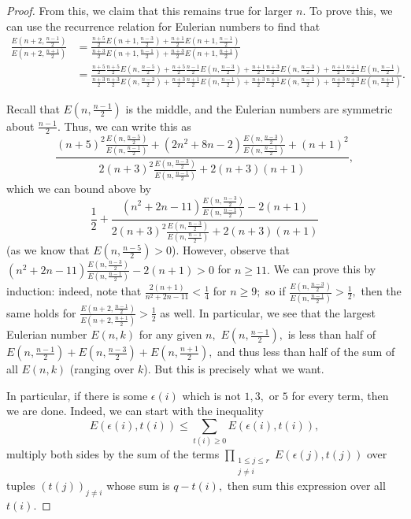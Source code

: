 \documentclass{article}
\theoremstyle{definition}
\theoremstyle{remark}
\begin{document}
\begin{proof}
\par From this, we claim that this remains true for larger $n.$ To prove this, we can use the recurrence relation for Eulerian numbers to find that \begin{align*}\frac{E(n+2, \frac{n-1}{2})}{E(n+2, \frac{n+1}{2})}  & = \frac{\frac{n+5}{2} E(n+1, \frac{n-3}{2}) + \frac{n+1}{2}E(n+1, \frac{n-1}{2})}{\frac{n+3}{2} E(n+1, \frac{n-1}{2}) + \frac{n+3}{2}E(n+1, \frac{n+1}{2})} \\ & = \frac{\frac{n+5}{2} \frac{n+5}{2} E(n, \frac{n-5}{2}) + \frac{n+5}{2} \frac{n-1}{2} E(n, \frac{n-3}{2}) + \frac{n+1}{2} \frac{n+3}{2} E(n, \frac{n-3}{2}) + \frac{n+1}{2} \frac{n + 1}{2}E(n, \frac{n-1}{2})}{\frac{n+3}{2} \frac{n+3}{2} E(n, \frac{n-3}{2}) + \frac{n+3}{2} \frac{n+1}{2} E(n, \frac{n-1}{2}) + \frac{n+3}{2} \frac{n+1}{2} E(n, \frac{n-1}{2}) + \frac{n+3}{2} \frac{n + 3}{2}E(n, \frac{n+1}{2})}.\end{align*} 
\par Recall that $E(n, \frac{n-1}{2})$ is the middle, and the Eulerian numbers are symmetric about $\frac{n-1}{2}.$ Thus, we can write this as \[\frac{(n+5)^2 \frac{E(n, \frac{n-5}{2})}{E(n, \frac{n-1}{2})} + (2n^2 + 8n - 2)\frac{E(n, \frac{n-3}{2})}{E(n, \frac{n-1}{2})} + (n+1)^2}{2(n+3)^2 \frac{E(n, \frac{n-3}{2})}{E(n, \frac{n-1}{2})} + 2(n+3)(n+1)},\] which we can bound above by \[\frac{1}{2} + \frac{(n^2 + 2n - 11)\frac{E(n, \frac{n-3}{2})}{E(n, \frac{n-1}{2})} - 2(n+1)}{2(n+3)^2 \frac{E(n, \frac{n-3}{2})}{E(n, \frac{n-1}{2})} + 2(n+3)(n+1)}\] (as we know that $E(n, \frac{n-5}{2}) > 0$). However, observe that $(n^2 + 2n - 11)\frac{E(n, \frac{n-3}{2})}{E(n, \frac{n-1}{2})} - 2(n+1) > 0$ for $n \geq 11.$ We can prove this by induction: indeed, note that $\frac{2(n+1)}{n^2 + 2n - 11} < \frac{1}{4}$ for $n \geq 9;$ so if $\frac{E(n, \frac{n-3}{2})}{E(n, \frac{n-1}{2})} > \frac{1}{2},$ then the same holds for $\frac{E(n + 2, \frac{n-1}{2})}{E(n+2, \frac{n+1}{2})} > \frac{1}{2}$ as well. In particular, we see that the largest Eulerian number $E(n, k)$ for any given $n,$ $E(n, \frac{n-1}{2}),$ is less than half of $E(n, \frac{n-1}{2}) + E(n, \frac{n-3}{2}) + E(n, \frac{n+1}{2}),$ and thus less than half of the sum of all $E(n, k)$ (ranging over $k$). But this is precisely what we want.
\par In particular, if there is some $\epsilon(i)$ which is not $1, 3,$ or $5$ for every term, then we are done. Indeed, we can start with the inequality \[E(\epsilon(i), t(i)) \leq \sum\limits_{t(i) \geq 0} E(\epsilon(i), t(i)),\] multiply both sides by the sum of the terms $\prod\limits_{\substack{1 \leq j \leq r \\ j \neq i}} E(\epsilon(j), t(j))$ over tuples $(t(j))_{j \neq i}$ whose sum is $q - t(i),$ then sum this expression over all $t(i).$

\end{proof}
\end{document}
